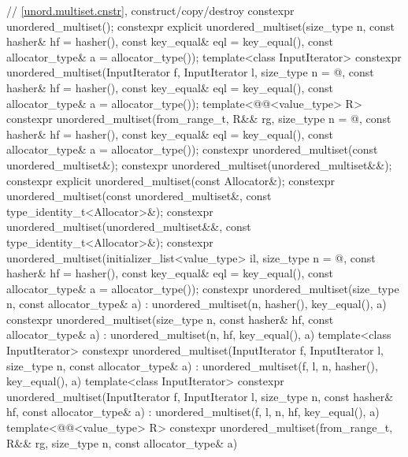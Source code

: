 \begin{codeblock}
{{    // \ref{unord.multiset.cnstr}, construct/copy/destroy
    constexpr unordered_multiset();
    constexpr explicit unordered_multiset(size_type n, const hasher& hf = hasher(),
                                          const key_equal& eql = key_equal(),
                                          const allocator_type& a = allocator_type());
    template<class InputIterator>
      constexpr unordered_multiset(InputIterator f, InputIterator l,
                                   size_type n = @\seebelow@, const hasher& hf = hasher(),
                                   const key_equal& eql = key_equal(),
                                   const allocator_type& a = allocator_type());
    template<@@<value_type> R>
      constexpr unordered_multiset(from_range_t, R&& rg,
                                   size_type n = @\seebelow@, const hasher& hf = hasher(),
                                   const key_equal& eql = key_equal(),
                                   const allocator_type& a = allocator_type());
    constexpr unordered_multiset(const unordered_multiset&);
    constexpr unordered_multiset(unordered_multiset&&);
    constexpr explicit unordered_multiset(const Allocator&);
    constexpr unordered_multiset(const unordered_multiset&, const type_identity_t<Allocator>&);
    constexpr unordered_multiset(unordered_multiset&&, const type_identity_t<Allocator>&);
    constexpr unordered_multiset(initializer_list<value_type> il,
                                 size_type n = @\seebelow@, const hasher& hf = hasher(),
                                 const key_equal& eql = key_equal(),
                                 const allocator_type& a = allocator_type());
    constexpr unordered_multiset(size_type n, const allocator_type& a)
      : unordered_multiset(n, hasher(), key_equal(), a) { }
    constexpr unordered_multiset(size_type n, const hasher& hf, const allocator_type& a)
      : unordered_multiset(n, hf, key_equal(), a) { }
    template<class InputIterator>
      constexpr unordered_multiset(InputIterator f, InputIterator l, size_type n,
                                   const allocator_type& a)
        : unordered_multiset(f, l, n, hasher(), key_equal(), a) { }
    template<class InputIterator>
      constexpr unordered_multiset(InputIterator f, InputIterator l, size_type n,
                                   const hasher& hf, const allocator_type& a)
      : unordered_multiset(f, l, n, hf, key_equal(), a) { }
    template<@@<value_type> R>
      constexpr unordered_multiset(from_range_t, R&& rg, size_type n, const allocator_type& a)
}}
\end{codeblock}
